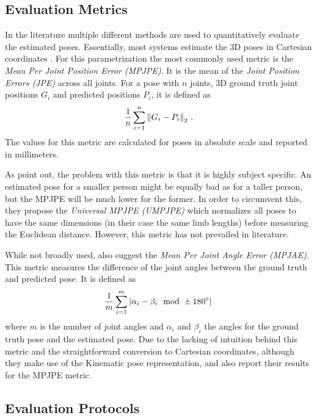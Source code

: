\subsection{Evaluation Metrics}
In the literature multiple different methods are used to quantitatively evaluate the estimated poses. 
Essentially, most systems estimate the 3D poses in Cartesian coordinates \cite{drover18, chen17, bogo16, grinciunaite16, yasin16, wandt19, tome17, tekin16, tekin17, pavlakos17}.
For this parametrization the most commonly used metric is the \emph{Mean Per Joint Position Error (MPJPE)}.
It is the mean of the \emph{Joint Position Errors (JPE)} across all joints.
For a pose with $n$ joints, 3D ground truth joint positions $G_i$ and predicted positions $P_i$, it is defined as
\begin{equation}
\frac{1}{n} \sum_{i = 1}^{n}  \norm{G_i - P_i}_2 \ .
\end{equation}
The values for this metric are calculated for poses in absolute scale and reported in millimeters.

As \citet{ionescu14} point out, the problem with this metric is that it is highly subject specific.
An estimated pose for a smaller person might be equally bad as for a taller person, but the MPJPE will be much lower for the former.
In order to circumvent this, they propose the \emph{Universal MPJPE (UMPJPE)} which normalizes all poses to have the same dimensions (in their case the same limb lengths) before measuring the Euclidean distance.
However, this metric has not prevailed in literature.

While not broadly used, \citet{ionescu14} also suggest the \emph{Mean Per Joint Angle Error (MPJAE)}.
This metric measures the difference of the joint angles between the ground truth and predicted pose.
It is defined as
\begin{equation}
\frac{1}{m} \sum_{i = 1}^{m} \abs{\alpha_i - \beta_i \mod \pm 180\degree} \,
\end{equation}
where $m$ is the number of joint angles and $\alpha_i$ and $\beta_i$ the angles for the ground truth pose and the estimated pose.
Due to the lacking of intuition behind this metric and the straightforward conversion to Cartesian coordinates, although they make use of the Kinematic pose representation, \citet{jahangiri17} and \citet{zhou16_2} also report their results for the MPJPE metric.

\subsection{Evaluation Protocols}

